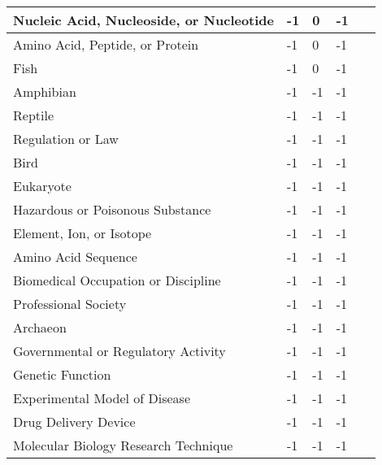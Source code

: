 \documentclass[10.7pt,]{article}
\begin{document}
\begin{longtable}{|l|p{0.3cm}|p{0.3cm}|p{0.3cm}|p{7.9cm}|}
        Nucleic Acid, Nucleoside, or Nucleotide & -1 & 0 & -1 & ~ \\ \hline
        Amino Acid, Peptide, or Protein & -1 & 0 & -1 & ~ \\ \hline
        Fish & -1 & 0 & -1 & ~ \\ \hline
        Amphibian & -1 & -1 & -1 & ~ \\ \hline
        Reptile & -1 & -1 & -1 & ~ \\ \hline
        Regulation or Law & -1 & -1 & -1 & ~ \\ \hline
        Bird & -1 & -1 & -1 & ~ \\ \hline
        Eukaryote & -1 & -1 & -1 & ~ \\ \hline
        Hazardous or Poisonous Substance & -1 & -1 & -1 & ~ \\ \hline
        Element, Ion, or Isotope & -1 & -1 & -1 & ~ \\ \hline
        Amino Acid Sequence & -1 & -1 & -1 & ~ \\ \hline
        Biomedical Occupation or Discipline & -1 & -1 & -1 & ~ \\ \hline
        Professional Society & -1 & -1 & -1 & ~ \\ \hline
        Archaeon & -1 & -1 & -1 & ~ \\ \hline
        Governmental or Regulatory Activity & -1 & -1 & -1 & ~ \\ \hline
        Genetic Function & -1 & -1 & -1 & ~ \\ \hline
        Experimental Model of Disease & -1 & -1 & -1 & ~ \\ \hline
        Drug Delivery Device & -1 & -1 & -1 & ~ \\ \hline
        Molecular Biology Research Technique & -1 & -1 & -1 & ~ \\ \hline
\end{longtable}
\end{document}
